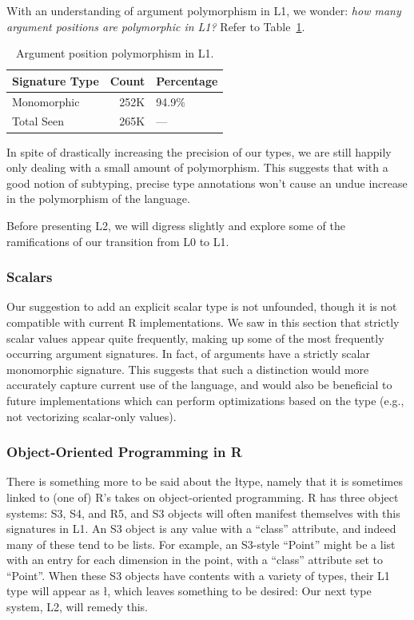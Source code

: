 \documentclass[acmsmall,10pt,review,anonymous]{acmart}\settopmatter{printfolios=true,printccs=false,printacmref=false}
\begin{document}
With an understanding of argument polymorphism in L1, we wonder: {\it how many argument positions are polymorphic in L1?}
Refer to Table~\ref{tab:argcountsL1}.

\begin{table}[ht]
\label{tab:argcountsL1}
\centering
\begin{tabular}{lrl}
  \hline
Signature Type & Count & Percentage \\ 
  \hline
  Monomorphic & 252K & 94.9\% \\ 
  Total Seen & 265K & --- \\ 
   \hline
\end{tabular}
\caption{Argument position polymorphism in L1.}
\end{table}

In spite of drastically increasing the precision of our types, we are still happily only dealing with a small amount of polymorphism.
This suggests that with a good notion of subtyping, precise type annotations won't cause an undue increase in the polymorphism of the language.

Before presenting L2, we will digress slightly and explore some of the ramifications of our transition from L0 to L1.

%
%
\subsubsection{Scalars}
\label{sec:scalars}

Our suggestion to add an explicit scalar type is not unfounded, though it is not compatible with current R implementations.
We saw in this section that strictly scalar values appear quite frequently, making up some of the most frequently occurring argument signatures.
In fact, \PERCSCALARMONO of arguments have a strictly scalar monomorphic signature.
This suggests that such a distinction would more accurately capture current use of the language, and would also be beneficial to future implementations which can perform optimizations based on the type (e.g., not vectorizing scalar-only values).

%
%
\subsubsection{Object-Oriented Programming in R}
\label{sec:S3S4R5}

There is something more to be said about the \l type, namely that it is sometimes linked to (one of) R's takes on object-oriented programming.
R has three object systems: S3, S4, and R5, and S3 objects will often manifest themselves with this signatures in L1.
An S3 object is any value with a ``class'' attribute, and indeed many of these tend to be lists.
For example, an S3-style ``Point'' might be a list with an entry for each dimension in the point, with a ``class'' attribute set to ``Point''.
When these S3 objects have contents with a variety of types, their L1 type will appear as \l, which leaves something to be desired:
Our next type system, L2, will remedy this.
\end{document}
